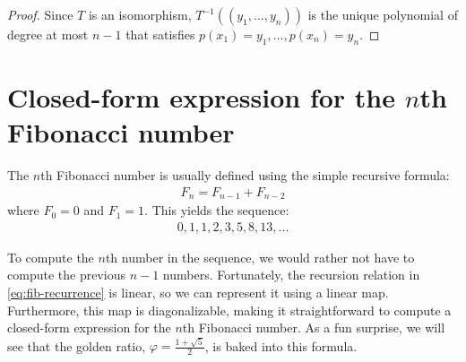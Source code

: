 \documentclass{article}
\numberwithin{equation}{section}
\begin{document}
\begin{proof}
Since $T$ is an isomorphism, $T^{-1}((y_1,...,y_n))$ is the unique polynomial of degree at most $n-1$ that satisfies $p(x_1)=y_1,...,p(x_n)=y_n.$
\end{proof}

\section{Closed-form expression for the $n$th Fibonacci number}
The $n$th Fibonacci number is usually defined using the simple recursive formula:
\begin{align}
\label{eq:fib-recurrence}
    F_n = F_{n-1}+F_{n-2}
\end{align}
where $F_0=0$ and $F_1=1.$ This yields the sequence:
\begin{align*}
    0,1,1,2,3,5,8,13,...
\end{align*}

To compute the $n$th number in the sequence, we would rather not have to compute the previous $n-1$ numbers. Fortunately, the recursion relation in \ref{eq:fib-recurrence} is linear, so we can represent it using a linear map. Furthermore, this map is diagonalizable, making it straightforward to compute a closed-form expression for the $n$th Fibonacci number. As a fun surprise, we will see that the golden ratio, $\varphi = \frac{1+\sqrt{5}}{2}$, is baked into this formula.
\end{document}
